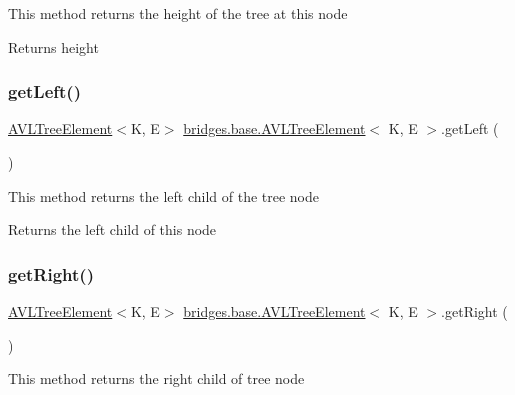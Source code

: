 This method returns the height of the tree at this node

\begin{DoxyReturn}{Returns}
height 
\end{DoxyReturn}
\mbox{\label{classbridges_1_1base_1_1_a_v_l_tree_element_a86f1329b19d2886ba7bf713e3844ecd6}} 
\subsubsection{\texorpdfstring{get\+Left()}{getLeft()}}
{\footnotesize\ttfamily \hyperlink{classbridges_1_1base_1_1_a_v_l_tree_element}{A\+V\+L\+Tree\+Element}$<$K, E$>$ \hyperlink{classbridges_1_1base_1_1_a_v_l_tree_element}{bridges.\+base.\+A\+V\+L\+Tree\+Element}$<$ K, E $>$.get\+Left (\begin{DoxyParamCaption}{ }\end{DoxyParamCaption})}

This method returns the left child of the tree node

\begin{DoxyReturn}{Returns}
the left child of this node 
\end{DoxyReturn}
\mbox{\label{classbridges_1_1base_1_1_a_v_l_tree_element_aab93418ac19605f2c7c57aa38d110921}} 
\subsubsection{\texorpdfstring{get\+Right()}{getRight()}}
{\footnotesize\ttfamily \hyperlink{classbridges_1_1base_1_1_a_v_l_tree_element}{A\+V\+L\+Tree\+Element}$<$K, E$>$ \hyperlink{classbridges_1_1base_1_1_a_v_l_tree_element}{bridges.\+base.\+A\+V\+L\+Tree\+Element}$<$ K, E $>$.get\+Right (\begin{DoxyParamCaption}{ }\end{DoxyParamCaption})}

This method returns the right child of tree node


